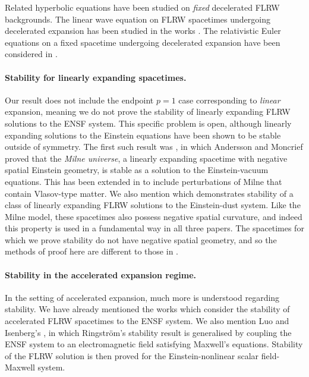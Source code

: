 \documentclass{article}
\begin{document}
Related hyperbolic equations have been studied on \emph{fixed} decelerated FLRW backgrounds. The linear wave equation on FLRW spacetimes undergoing decelerated expansion has been studied in the works \cite{KlaSar:waveformulaFLRW:81,NatRos:waveformulaFLRW:23,Hag:waveFLRW:25}. The relativistic Euler equations on a fixed spacetime undergoing decelerated expansion have been considered in \cite{Spe:relEulerstab:13,Fajetal:decelEulerstab:25}.

\paragraph{Stability for linearly expanding spacetimes.}
Our result does not include the endpoint $p=1$ case corresponding to \emph{linear} expansion, meaning we do not prove the stability of linearly expanding FLRW solutions to the ENSF system. This specific problem is open, although linearly expanding solutions to the Einstein equations have been shown to be stable outside of symmetry. The first such result was \cite{AndMon:Milnestab:11}, in which Andersson and Moncrief proved that the \emph{Milne universe}, a linearly expanding spacetime with negative spatial Einstein geometry, is stable as a solution to the Einstein-vacuum equations. This has been extended in \cite{AndFaj:Milnestab:20} to include perturbations of Milne that contain Vlasov-type matter. We also mention \cite{FajOfnWya:linearduststab:24} which demonstrates stability of a class of linearly expanding FLRW solutions to the Einstein-dust system. Like the Milne model, these spacetimes also possess negative spatial curvature, and indeed this property is used in a fundamental way in all three papers. The spacetimes for which we prove stability do not have negative spatial geometry, and so the methods of proof here are different to those in \cite{AndMon:Milnestab:11,AndFaj:Milnestab:20,FajOfnWya:linearduststab:24}.
\paragraph{Stability in the accelerated expansion regime.}
In the setting of accelerated expansion, much more is understood regarding stability. We have already mentioned the works \cite{HeiRen:powerlawstab:07,Rin:powerlaw:09} which consider the stability of accelerated FLRW spacetimes to the ENSF system. We also mention Luo and Isenberg's \cite{LuoIse:powerlawmag:13}, in which Ringstr\"om's stability result is generalised by coupling the ENSF system to an electromagnetic field satisfying Maxwell's equations. Stability of the FLRW solution is then proved for the Einstein-nonlinear scalar field-Maxwell system.
\end{document}

